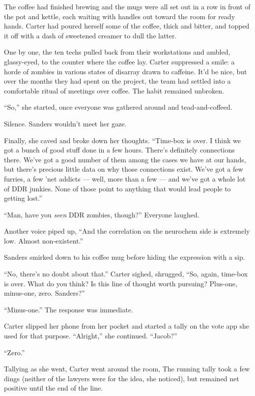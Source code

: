 The coffee had finished brewing and the mugs were all set out in a row in front of the pot and kettle, each waiting with handles out toward the room for ready hands. Carter had poured herself some of the coffee, thick and bitter, and topped it off with a dash of sweetened creamer to dull the latter.

One by one, the ten techs pulled back from their workstations and ambled, glassy-eyed, to the counter where the coffee lay. Carter suppressed a smile: a horde of zombies in various states of disarray drawn to caffeine. It'd be nice, but over the months they had spent on the project, the team had settled into a comfortable ritual of meetings over coffee. The habit remained unbroken.

``So,'' she started, once everyone was gathered around and tead-and-coffeed.

Silence. Sanders wouldn't meet her gaze.

Finally, she caved and broke down her thoughts. ``Time-box is over. I think we got a bunch of good stuff done in a few hours. There's definitely connections there. We've got a good number of them among the cases we have at our hands, but there's precious little data on why those connections exist. We've got a few furries, a few 'net addicts — well, more than a few — and we've got a whole lot of DDR junkies. None of those point to anything that would lead people to getting lost.''

``Man, have you \emph{seen} DDR zombies, though?'' Everyone laughed.

Another voice piped up, ``And the correlation on the neurochem side is extremely low. Almost non-existent.''

Sanders smirked down to his coffee mug before hiding the expression with a sip.

``No, there's no doubt about that.'' Carter sighed, shrugged, ``So, again, time-box is over. What do you think? Is this line of thought worth pursuing? Plus-one, minus-one, zero. Sanders?''

``Minus-one.'' The response was immediate.

Carter slipped her phone from her pocket and started a tally on the vote app she used for that purpose. ``Alright,'' she continued. ``Jacob?''

``Zero.''

Tallying as she went, Carter went around the room, The running tally took a few dings (neither of the lawyers were for the idea, she noticed), but remained net positive until the end of the line.

